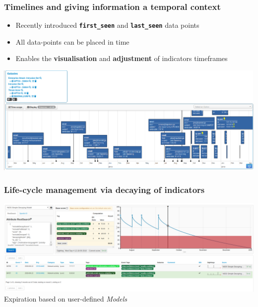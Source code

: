 \begin{frame}
  \frametitle{Timelines and giving information a temporal context}
  \begin{itemize}
    \item Recently introduced {\bf \texttt{first\_seen}} and {\bf \texttt{last\_seen}} data points
    \item All data-points can be placed in time
    \item Enables the {\bf visualisation} and {\bf adjustment} of indicators timeframes 
  \end{itemize}
  \begin{center}
    \includegraphics[width=1.0\linewidth]{timeline-misp-overview.png}
  \end{center}
\end{frame}


\begin{frame}
    \frametitle{Life-cycle management via decaying of indicators}
    \includegraphics[width=1.00\linewidth]{decaying-simulation.png}
    Expiration based on user-defined \textit{Models}
\end{frame}

